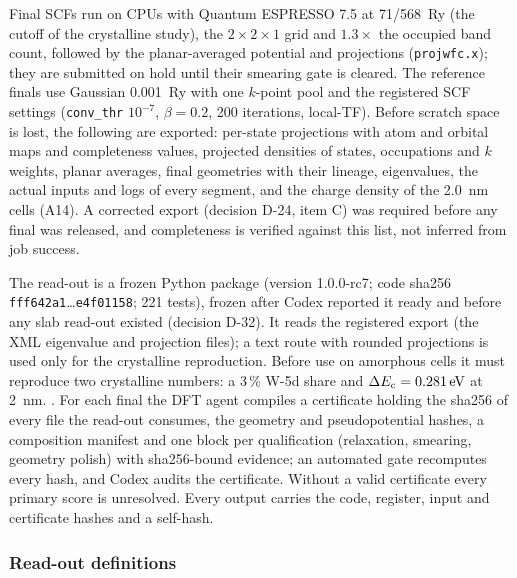 Final SCFs run on CPUs with Quantum ESPRESSO 7.5 at 71/568~Ry (the cutoff of the crystalline study), the
$2\times2\times1$ grid and $1.3\times$ the occupied band count, followed by the planar-averaged potential and
projections (\texttt{projwfc.x}); they are submitted on hold until their smearing gate is cleared. %
The reference finals use Gaussian 0.001~Ry with one $k$-point pool and the registered SCF settings
(\texttt{conv\_thr} $10^{-7}$, $\beta = 0.2$, 200 iterations, local-TF). %
Before scratch space is lost, the following are exported: per-state projections with atom and orbital maps and
completeness values, projected densities of states, occupations and $k$ weights, planar averages, final geometries
with their lineage, eigenvalues, the actual inputs and logs of every segment, and the charge density of the
\SI{2.0}{nm} cells (A14). %
A corrected export (decision D-24, item C) was required before any final was released, and completeness is verified
against this list, not inferred from job success. %

The read-out is a frozen Python package (version 1.0.0-rc7; code sha256 \texttt{fff642a1}\ldots\texttt{e4f01158};
221 tests), frozen after Codex reported it ready and before any slab read-out existed (decision D-32). %
It reads the registered export (the XML eigenvalue and projection files); a text route with rounded projections is
used only for the crystalline reproduction. %
Before use on amorphous cells it must reproduce two crystalline numbers: a 3\,\% W-5d share and
$\Delta E_{\mathrm{c}} = \SI{0.281}{eV}$ at \SI{2}{nm}. %
.
For each final the DFT agent compiles a certificate holding the sha256 of every file the read-out consumes, the
geometry and pseudopotential hashes, a composition manifest and one block per qualification (relaxation, smearing,
geometry polish) with sha256-bound evidence; an automated gate recomputes every hash, and Codex audits the
certificate. Without a valid certificate every primary score is unresolved. %
Every output carries the code, register, input and certificate hashes and a self-hash. %

\subsubsection{Read-out definitions}
\label{sec:m-dft-readout}

